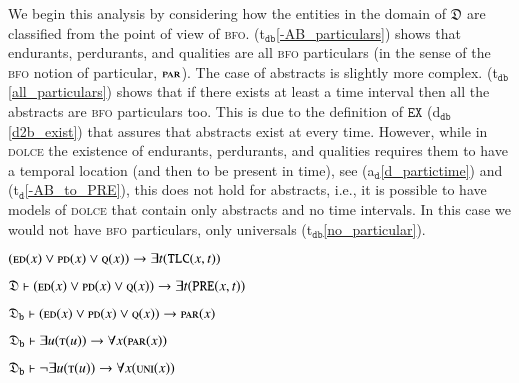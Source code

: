 \documentclass[ao]{iosart2x}
\newcommand{\bflist}{\begin{list}{}{\setlength{\topsep}{2mm}\setlength{\parsep}{0mm}\setlength{\leftmargin}{9.2mm}\setlength{\labelwidth}{8mm}}}
\newcommand{\eflist}{\end{list}}
\newcommand{\dolceAxLabel}{\textrm{a$_\texttt{d}$}}
\newcommand{\dolceThrLabel}{\textrm{t$_\texttt{d}$}}
\newcommand{\dbDefLabel}{\textrm{d$_\texttt{db}$}}
\newcommand{\dbThrLabel}{\textrm{t$_\texttt{db}$}}
\newcounter{cntax}
\newcommand{\dolceax}[1]{\refstepcounter{cntax}\begin{small}{\bf \dolceAxLabel\thecntax\label{#1}}\end{small}}
\newcounter{cntthr}
\newcommand{\dolceth}[1]{\refstepcounter{cntthr}\begin{small}{\bf \dolceThrLabel\thecntthr\label{#1}}\end{small}}
\newcounter{cntdbth}
\newcommand{\dbth}[1]{\refstepcounter{cntdbth}\begin{small}{\bf \dbThrLabel\thecntdbth\label{#1}}\end{small}}
\newcommand{\refdolceax}[1]{({\dolceAxLabel}\ref{#1})}
\newcommand{\refdolceth}[1]{({\dolceThrLabel}\ref{#1})}
\newcommand{\refdbdf}[1]{({\dbDefLabel}\ref{#1})}
\newcommand{\refdbth}[1]{({\dbThrLabel}\ref{#1})}
\newcommand{\pr}[1]{\mathtt{#1}}
\newcommand{\dolce}{{\textsc{dolce}}}
\newcommand{\bfo}{{\textsc{bfo}}}
\newcommand {\thdolce} {\ensuremath{\mathfrak{D}}}
\newcommand {\thdolcedbmap} {\ensuremath{\mathfrak{D}_\texttt{b}}}
\newcommand {\EDdcat} {\textsc{ed}}
\newcommand {\PDdcat} {\textsc{pd}}
\newcommand {\Qdcat} {\textsc{q}}
\newcommand {\Tdcat} {\textsc{t}}
\newcommand {\PREd} {\ensuremath{\pr{PRE}}}
\newcommand {\TLCd} {\ensuremath{\pr{TLC}}}
\newcommand{\bfopartic}{\textsc{par}}
\newcommand{\bfouniv}{\textsc{uni}}
\newcommand{\bfoexist}{\pr{EX}}
\begin{document}
We begin this analysis by considering how the entities in the domain of $\thdolce$ are classified from the point of view of {\bfo}. \refdbth{-AB_particulars} shows that endurants, perdurants, and qualities are all {\bfo} particulars (in the sense of the {\bfo} notion of particular, $\bfopartic$). The case of abstracts is slightly more complex. \refdbth{all_particulars} shows that if there exists at least a time interval then all the abstracts are {\bfo} particulars too. This is due to the definition of $\bfoexist$ \refdbdf{d2b_exist} that assures that abstracts exist at every time. However, while in {\dolce} the existence of endurants, perdurants, and qualities requires them to have a temporal location (and then to be present in time), see \refdolceax{d_partictime} and \refdolceth{-AB_to_PRE}, this does not hold for abstracts, i.e., it is possible to have models of {\dolce} that contain only abstracts and no time intervals. In this case we would not have {\bfo} particulars, only universals \refdbth{no_particular}.

\bflist
\item[\dolceax{d_partictime}] $(\EDdcat(x) \lor \PDdcat(x) \lor \Qdcat(x)) \to \exists t(\TLCd(x,t))$ 

\item[\dolceth{-AB_to_PRE}] $\thdolce \vdash (\EDdcat(x) \lor \PDdcat(x) \lor \Qdcat(x)) \to \exists t(\PREd(x,t))$

\item[\dbth{-AB_particulars}] $\thdolcedbmap \vdash (\EDdcat(x) \lor \PDdcat(x) \lor \Qdcat(x)) \to \bfopartic(x)$

\item[\dbth{all_particulars}] $\thdolcedbmap \vdash \exists u(\Tdcat(u)) \to \forall x(\bfopartic(x))$

\item[\dbth{no_particular}] $\thdolcedbmap \vdash \neg\exists u(\Tdcat(u)) \to \forall x(\bfouniv(x))$

\eflist
\end{document}
